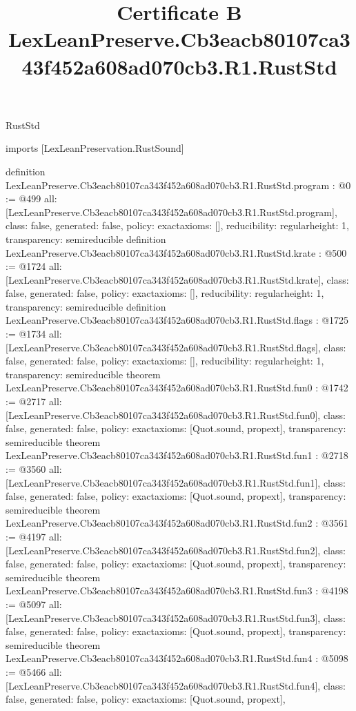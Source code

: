 \begin{lexlean}{RustStd}
\title{Certificate B LexLeanPreserve.Cb3eacb80107ca343f452a608ad070cb3.R1.RustStd}
\begin{coremodule}
imports [LexLeanPreservation.RustSound]

definition LexLeanPreserve.Cb3eacb80107ca343f452a608ad070cb3.R1.RustStd.program : @0 := @499 {
  all: [LexLeanPreserve.Cb3eacb80107ca343f452a608ad070cb3.R1.RustStd.program],
  class: false,
  generated: false,
  policy: exact{axioms: []},
  reducibility: regular{height: 1},
  transparency: semireducible
}
definition LexLeanPreserve.Cb3eacb80107ca343f452a608ad070cb3.R1.RustStd.krate : @500 := @1724 {
  all: [LexLeanPreserve.Cb3eacb80107ca343f452a608ad070cb3.R1.RustStd.krate],
  class: false,
  generated: false,
  policy: exact{axioms: []},
  reducibility: regular{height: 1},
  transparency: semireducible
}
definition LexLeanPreserve.Cb3eacb80107ca343f452a608ad070cb3.R1.RustStd.flags : @1725 := @1734 {
  all: [LexLeanPreserve.Cb3eacb80107ca343f452a608ad070cb3.R1.RustStd.flags],
  class: false,
  generated: false,
  policy: exact{axioms: []},
  reducibility: regular{height: 1},
  transparency: semireducible
}
theorem LexLeanPreserve.Cb3eacb80107ca343f452a608ad070cb3.R1.RustStd.fun0 : @1742 := @2717 {
  all: [LexLeanPreserve.Cb3eacb80107ca343f452a608ad070cb3.R1.RustStd.fun0],
  class: false,
  generated: false,
  policy: exact{axioms: [Quot.sound, propext]},
  transparency: semireducible
}
theorem LexLeanPreserve.Cb3eacb80107ca343f452a608ad070cb3.R1.RustStd.fun1 : @2718 := @3560 {
  all: [LexLeanPreserve.Cb3eacb80107ca343f452a608ad070cb3.R1.RustStd.fun1],
  class: false,
  generated: false,
  policy: exact{axioms: [Quot.sound, propext]},
  transparency: semireducible
}
theorem LexLeanPreserve.Cb3eacb80107ca343f452a608ad070cb3.R1.RustStd.fun2 : @3561 := @4197 {
  all: [LexLeanPreserve.Cb3eacb80107ca343f452a608ad070cb3.R1.RustStd.fun2],
  class: false,
  generated: false,
  policy: exact{axioms: [Quot.sound, propext]},
  transparency: semireducible
}
theorem LexLeanPreserve.Cb3eacb80107ca343f452a608ad070cb3.R1.RustStd.fun3 : @4198 := @5097 {
  all: [LexLeanPreserve.Cb3eacb80107ca343f452a608ad070cb3.R1.RustStd.fun3],
  class: false,
  generated: false,
  policy: exact{axioms: [Quot.sound, propext]},
  transparency: semireducible
}
theorem LexLeanPreserve.Cb3eacb80107ca343f452a608ad070cb3.R1.RustStd.fun4 : @5098 := @5466 {
  all: [LexLeanPreserve.Cb3eacb80107ca343f452a608ad070cb3.R1.RustStd.fun4],
  class: false,
  generated: false,
  policy: exact{axioms: [Quot.sound, propext]},
}
\end{coremodule}
\end{lexlean}
